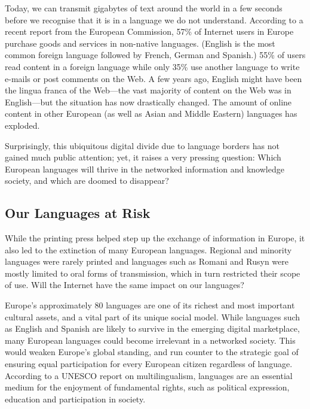 \begin{multicols}{2}
Today, we can transmit gigabytes of text around the world in a few seconds before we recognise that it is in a language we do not understand. According to a recent report from the European Commission, 57\% of Internet users in Europe purchase goods and services in non-native languages. (English is the most common foreign language followed by French, German and Spanish.) 55\% of users read content in a foreign language while only 35\% use another language to write e-mails or post comments on the Web\cite{EC1}. A few years ago, English might have been the lingua franca of the Web—the vast majority of content on the Web was in English—but the situation has now drastically changed. The amount of online content in other European (as well as Asian and Middle Eastern) languages has exploded.

Surprisingly, this ubiquitous digital divide due to language borders has not gained much public attention; yet, it raises a very pressing question: Which European languages will thrive in the networked information and knowledge society, and which are doomed to disappear?

\subsection{Our Languages at Risk}
While the printing press helped step up the exchange of information in Europe, it also led to the extinction of many European languages. Regional and minority languages were rarely printed and languages such as Romani and Rusyn were mostly limited to oral forms of transmission, which in turn restricted their scope of use. Will the Internet have the same impact on our languages?

 
Europe’s approximately 80 languages are one of its richest and most important cultural assets, and a vital part of its unique social model\cite{EC2}. While languages such as English and Spanish are likely to survive in the emerging digital marketplace, many European languages could become irrelevant in a networked society. This would weaken Europe’s global standing, and run counter to the strategic goal of ensuring equal participation for every European citizen regardless of language. According to a UNESCO report on multilingualism, languages are an essential medium for the enjoyment of fundamental rights, such as political expression, education and participation in society\cite{Unesco1}.
\vfill


\end{multicols}
